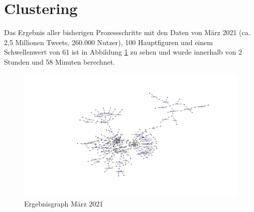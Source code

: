 \section{Clustering}
Das Ergebnis aller bisherigen Prozessschritte mit den Daten von März 2021 (ca. 2,5 Millionen Tweets, 260.000 Nutzer), 100 Hauptfiguren und einem Schwellenwert von 61 ist in Abbildung \ref{fig:noclusters} zu sehen und wurde innerhalb von 2 Stunden und 58 Minuten berechnet. 
\begin{figure}[h!]
	\centering
	\includegraphics[width=\linewidth]{images/NoClusters}
	\caption[]{Ergebnisgraph März 2021}
	\label{fig:noclusters}
\end{figure}









